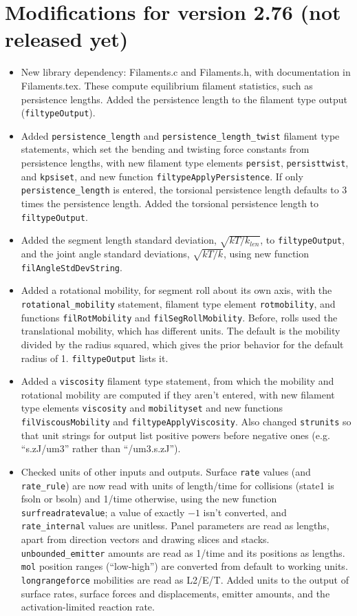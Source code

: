 \documentclass {scrbook}
\newcommand {\ttt} {\texttt}
\begin{document}
\section{Modifications for version 2.76 (not released yet)}
\begin{itemize}
\item New library dependency: Filaments.c and Filaments.h, with documentation in Filaments.tex. These compute equilibrium filament statistics, such as persistence lengths. Added the persistence length to the filament type output (\ttt{filtypeOutput}).
\item Added \ttt{persistence\_length} and \ttt{persistence\_length\_twist} filament type statements, which set the bending and twisting force constants from persistence lengths, with new filament type elements \ttt{persist}, \ttt{persisttwist}, and \ttt{kpsiset}, and new function \ttt{filtypeApplyPersistence}. If only \ttt{persistence\_length} is entered, the torsional persistence length defaults to 3 times the persistence length. Added the torsional persistence length to \ttt{filtypeOutput}.
\item Added the segment length standard deviation, $\sqrt{kT/k_{len}}$, to \ttt{filtypeOutput}, and the joint angle standard deviations, $\sqrt{kT/k}$, using new function \ttt{filAngleStdDevString}.
\item Added a rotational mobility, for segment roll about its own axis, with the \ttt{rotational\_mobility} statement, filament type element \ttt{rotmobility}, and functions \ttt{filRotMobility} and \ttt{filSegRollMobility}. Before, rolls used the translational mobility, which has different units. The default is the mobility divided by the radius squared, which gives the prior behavior for the default radius of 1. \ttt{filtypeOutput} lists it.
\item Added a \ttt{viscosity} filament type statement, from which the mobility and rotational mobility are computed if they aren't entered, with new filament type elements \ttt{viscosity} and \ttt{mobilityset} and new functions \ttt{filViscousMobility} and \ttt{filtypeApplyViscosity}. Also changed \ttt{strunits} so that unit strings for output list positive powers before negative ones (e.g. ``s.zJ/um3'' rather than ``/um3.s.zJ'').
\item Checked units of other inputs and outputs. Surface \ttt{rate} values (and \ttt{rate\_rule}) are now read with units of length/time for collisions (state1 is fsoln or bsoln) and 1/time otherwise, using the new function \ttt{surfreadratevalue}; a value of exactly $-1$ isn't converted, and \ttt{rate\_internal} values are unitless. Panel parameters are read as lengths, apart from direction vectors and drawing slices and stacks. \ttt{unbounded\_emitter} amounts are read as 1/time and its positions as lengths. \ttt{mol} position ranges (``low-high'') are converted from default to working units. \ttt{longrangeforce} mobilities are read as L2/E/T. Added units to the output of surface rates, surface forces and displacements, emitter amounts, and the activation-limited reaction rate.

\end{itemize}
\end{document}
